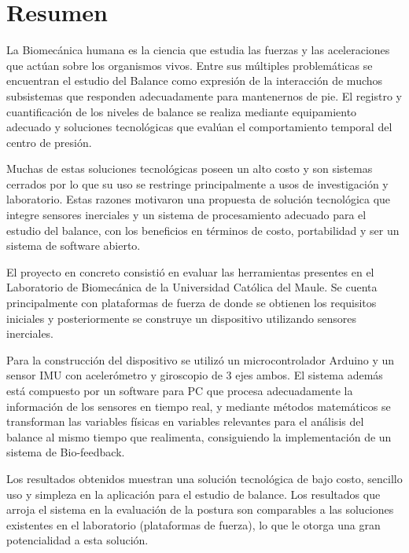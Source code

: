 \documentclass[12pt,a4paper]{article}
\begin{document}
\section*{Resumen}
La Biomecánica humana es la ciencia que estudia las fuerzas y las aceleraciones que actúan sobre los organismos vivos. Entre sus múltiples problemáticas se encuentran el estudio del Balance como expresión de la interacción de muchos subsistemas que responden adecuadamente para mantenernos de pie. El registro y cuantificación de los niveles de balance se realiza mediante equipamiento adecuado y soluciones tecnológicas que evalúan el comportamiento temporal del centro de presión.

Muchas de estas soluciones tecnológicas poseen un alto costo y son sistemas cerrados por lo que su uso se restringe principalmente a usos de investigación y laboratorio. Estas razones motivaron una propuesta de solución tecnológica que integre sensores inerciales y un sistema de procesamiento adecuado para el estudio del balance, con los beneficios en términos de costo, portabilidad y ser un sistema de software abierto.

El proyecto en concreto consistió en evaluar las herramientas presentes en el Laboratorio de Biomecánica de la Universidad Católica del Maule. Se cuenta principalmente con plataformas de fuerza de donde se obtienen los requisitos iniciales y posteriormente se construye un dispositivo utilizando sensores inerciales.

Para la construcción del dispositivo se utilizó un microcontrolador Arduino y un sensor IMU con acelerómetro y giroscopio de 3 ejes ambos. El sistema además está compuesto por un software para PC que procesa adecuadamente la información de los sensores en tiempo real, y mediante métodos matemáticos se transforman las variables físicas en variables relevantes para el análisis del balance al mismo tiempo que realimenta, consiguiendo la implementación de un sistema de Bio-feedback.

Los resultados obtenidos muestran una solución tecnológica de bajo costo, sencillo uso y simpleza en la aplicación para el estudio de balance. Los resultados que arroja el sistema en la evaluación de la postura son comparables a las soluciones existentes en el laboratorio (plataformas de fuerza), lo que le otorga una gran potencialidad a esta solución.

\newpage

\thispagestyle{empty}
\tableofcontents %
\thispagestyle{empty}
\listoffigures
\thispagestyle{empty}
\newpage
\listoftables
\end{document}
